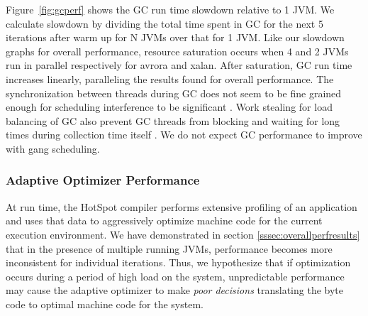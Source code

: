 \documentclass{sig-alternate}
\begin{document}
Figure~\ref{fig:gcperf} shows the GC run time slowdown relative to 1 JVM. We calculate slowdown by dividing the total time spent in GC for the next 5 iterations after warm up for N JVMs over that for 1 JVM. Like our slowdown graphs for overall performance, resource saturation occurs when 4 and 2 JVMs run in parallel respectively for avrora and xalan. After saturation, GC run time increases linearly, paralleling the results found for overall performance. The synchronization between threads during GC does not seem to be fine grained enough for scheduling interference to be significant \cite{feitelson1992gang}. Work stealing for load balancing of GC also prevent GC threads from blocking and waiting for long times during collection time itself \cite{stoptheworldgc}. We do not expect GC performance to improve with gang scheduling.

\begin{figure*}
\centering
{}
\caption{GC run time slowdown relative to 1 JVM.}
\label{fig:gcperf}
\end{figure*}

\subsubsection{Adaptive Optimizer Performance}
\begin{figure*}
\centering
{}
\caption{Mean total run time of JVMs warmed up in isolation and with 16 running JVMs in parallel.}
\label{fig:jitperf}
\end{figure*}

At run time, the HotSpot compiler performs extensive profiling of an application and uses that data to aggressively optimize machine code for the current execution environment\cite{hotspot:whitepaper}. We have demonstrated in section \ref{sssec:overallperfresults} that in the presence of multiple running JVMs, performance becomes more inconsistent for individual iterations. Thus, we hypothesize that if optimization occurs during a period of high load on the system, unpredictable performance may cause the adaptive optimizer to make \textit{poor decisions} translating the byte code to optimal machine code for the system.
\end{document}
